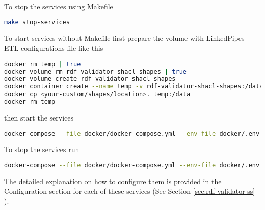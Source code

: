 To stop the services using Makefile

\begin{lstlisting}[language=bash,]
make stop-services
\end{lstlisting}

To start services without Makefile first prepare the volume with LinkedPipes ETL configurations file like this

\begin{lstlisting}[language=bash,]
docker rm temp | true
docker volume rm rdf-validator-shacl-shapes | true
docker volume create rdf-validator-shacl-shapes
docker container create --name temp -v rdf-validator-shacl-shapes:/data busybox
docker cp <your-custom/shapes/location>. temp:/data
docker rm temp
\end{lstlisting}

then start the services

\begin{lstlisting}[language=bash,]
docker-compose --file docker/docker-compose.yml --env-file docker/.env up -d
\end{lstlisting}

To stop the services run

\begin{lstlisting}[language=bash,]
docker-compose --file docker/docker-compose.yml --env-file docker/.env down
\end{lstlisting}

The detailed explanation on how to configure them is provided in the Configuration section for each of these services (See Section \ref{sec:rdf-validator-ss} ).

